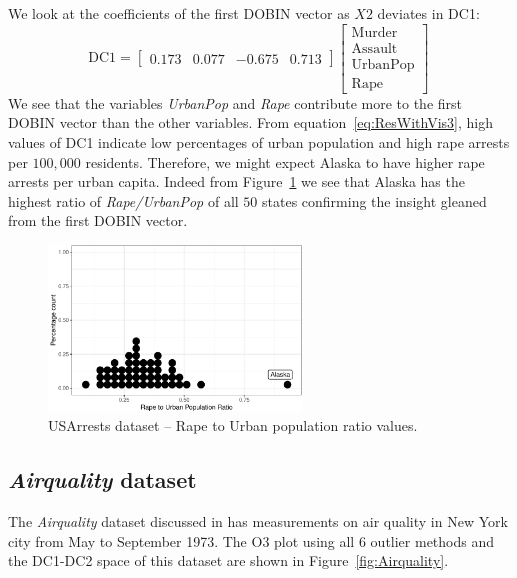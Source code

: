 \documentclass[a4paper,12pt]{article}
\begin{document}
We look at the coefficients of the first DOBIN vector as $X2$ deviates in DC1:
\begin{equation}\label{eq:ResWithVis3}
	\text{DC1} = \begin{bmatrix}
		0.173 & 0.077 & -0.675 & 0.713
	\end{bmatrix}
	\begin{bmatrix}
		\text{Murder}   \\
		\text{Assault}  \\
		\text{UrbanPop} \\
		\text{Rape}
	\end{bmatrix} \,
\end{equation}
We see that the variables \textit{UrbanPop} and \textit{Rape} contribute more to the first DOBIN vector than the other variables. From equation~\eqref{eq:ResWithVis3}, high values of DC1 indicate low percentages of urban population and high rape arrests per $100,000$ residents. Therefore, we might expect Alaska to have higher rape arrests per urban capita. Indeed from Figure~\ref{fig:USArrests3} we see that Alaska has the highest ratio of \textit{Rape/UrbanPop} of all $50$ states confirming the insight gleaned from the first DOBIN vector.

\begin{figure}[!ht]
	\centering
	\includegraphics[width=0.6\textwidth]{Ex3_3.pdf}
	\caption{USArrests dataset -- Rape to Urban population ratio values.}
	\label{fig:USArrests3}
\end{figure}

\subsection{\textit{Airquality} dataset}\label{sec:ResWithVis4}

The \textit{Airquality} dataset discussed in \cite{john1983graphical} has measurements on air quality in New York city from May to September 1973. The O3 plot using all $6$ outlier methods and the DC1-DC2 space of this dataset are shown in Figure~\ref{fig:Airquality}.
\end{document}
